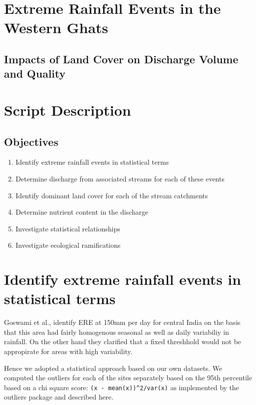 \documentclass{article}
\begin{document}
\section*{Extreme Rainfall Events in the Western Ghats}

\subsection*{Impacts of Land Cover on Discharge Volume and Quality}

\section*{Script Description}

\subsection*{Objectives}

\begin{enumerate}
\item Identify extreme rainfall events in statistical terms
\item Determine discharge from associated streams for each of these events
\item Identify dominant land cover for each of the stream catchments 
\item Determine nutrient content in the discharge
\item Investigate statistical relationships
\item Investigate ecological ramifications
\end{enumerate}

\section*{Identify extreme rainfall events in statistical terms}

\par Goswami et al., identify ERE at 150mm per day for central India on the basis that this area had fairly homogenous seasonal as well as daily variabiliy in rainfall. On the other hand they clarified that a fixed threshhold would not be appropirate for areas with high variability.

\par Hence we adopted a statistical approach based on our own datasets. We computed the outliers for each of the sites separately based on the 95th percentile based on a chi square score: \texttt{(x - mean(x))\^{}2/var(x)} as implemented by the outliers package and described here.
\end{document}
